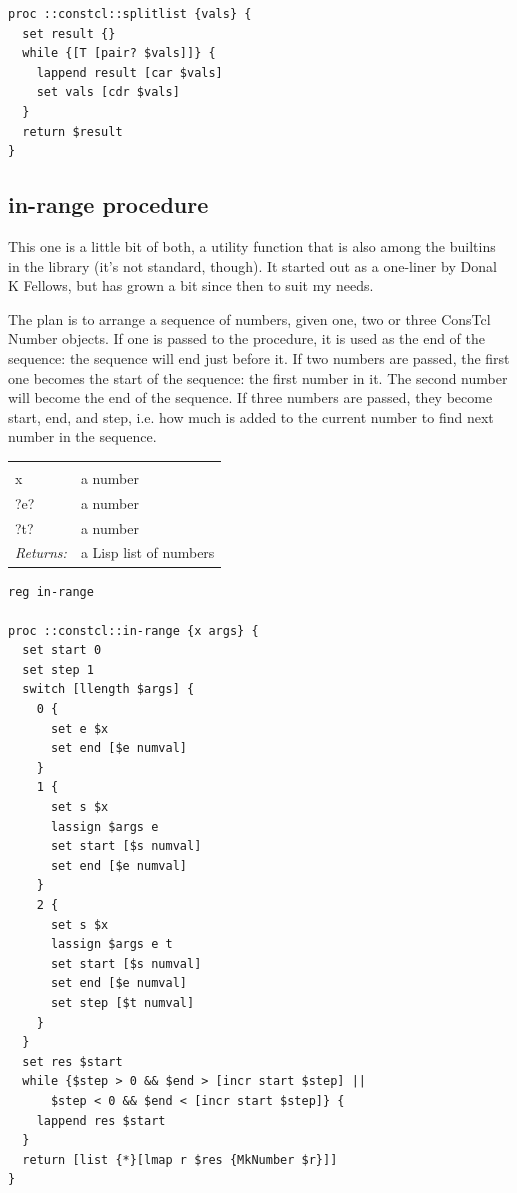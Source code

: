 \documentclass[twoside]{report}
\begin{document}
\begin{lstlisting}
proc ::constcl::splitlist {vals} {
  set result {}
  while {[T [pair? $vals]]} {
    lappend result [car $vals]
    set vals [cdr $vals]
  }
  return $result
}
\end{lstlisting}

\subsection{in-range procedure}
\label{inrange-procedure}

This one is a little bit of both, a utility function that is also among the builtins in the library (it's not standard, though). It started out as a one-liner by Donal K Fellows, but has grown a bit since then to suit my needs.

The plan is to arrange a sequence of numbers, given one, two or three ConsTcl Number objects. If one is passed to the procedure, it is used as the end of the sequence: the sequence will end just before it. If two numbers are passed, the first one becomes the start of the sequence: the first number in it. The second number will become the end of the sequence. If three numbers are passed, they become start, end, and step, i.e. how much is added to the current number to find next number in the sequence.

\noindent\begin{tabular}{ |p{1.9cm} p{8cm}| }
\hline
\rowcolor[HTML]{CCCCCC} \multicolumn{2}{|l|}{\bf in-range (public)} \\
x & a number \\
?e? & a number \\
?t? & a number \\
\textit{Returns:} & a Lisp list of numbers \\
\hline
\end{tabular}

\begin{lstlisting}
reg in-range

proc ::constcl::in-range {x args} {
  set start 0
  set step 1
  switch [llength $args] {
    0 {
      set e $x
      set end [$e numval]
    }
    1 {
      set s $x
      lassign $args e
      set start [$s numval]
      set end [$e numval]
    }
    2 {
      set s $x
      lassign $args e t
      set start [$s numval]
      set end [$e numval]
      set step [$t numval]
    }
  }
  set res $start
  while {$step > 0 && $end > [incr start $step] ||
      $step < 0 && $end < [incr start $step]} {
    lappend res $start
  }
  return [list {*}[lmap r $res {MkNumber $r}]]
}
\end{lstlisting}
\end{document}
